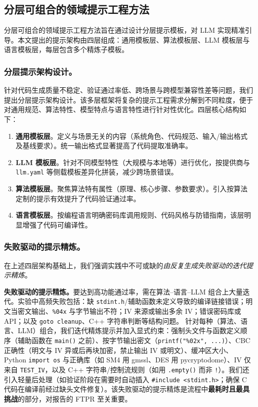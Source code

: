 \documentclass[12pt]{llncs}
\begin{document}
\subsection{分层可组合的领域提示工程方法}
分层可组合的领域提示工程方法旨在通过设计分层提示模板，对 LLM 实现精准引导。本文提出的提示架构由四层组成：通用模板层、算法模板层、LLM 模板层与语言模板层，每层包含多个精炼子模板。

\subsubsection{分层提示架构设计。}
针对代码生成质量不稳定、验证通过率低、跨场景与跨模型兼容性差等问题，我们提出分层提示架构设计。该多层框架将复杂的提示工程需求分解到不同粒度，便于对通用规范、算法特性、模型特点与语言特性进行针对性优化。四层核心结构如下：

\begin{enumerate}
    \item \textbf{通用模板层}。定义与场景无关的内容（系统角色、代码规范、输入/输出格式及基线要求）。统一输出格式显著提高了代码提取准确率。

    \item \textbf{LLM 模板层}。针对不同模型特性（大规模与本地等）进行优化，按提供商与 \texttt{llm.yaml} 等侧载模板差异化拼装，减少跨场景错误。

    \item \textbf{算法模板层}。聚焦算法特有属性（原理、核心步骤、参数要求）。引入按算法定制的提示有效提升了代码验证通过率。

    \item \textbf{语言模板层}。按编程语言明确密码库调用规则、代码风格与防错指南，该层明显增强了代码可编译性。
\end{enumerate}

\subsubsection{失败驱动的提示精炼。}
在上述四层架构基础上，我们强调实践中不可或缺的\emph{由反复生成失败驱动的迭代提示精炼}。

\textbf{失败驱动的提示精炼。}要达到高功能通过率，需在算法–语言–LLM 组合上大量迭代。实验中高频失败包括：缺 \texttt{stdint.h}/辅助函数未定义导致的编译链接错误；明文当密文输出、\texttt{\%04x} 与字节输出不符；IV 来源或输出多余 IV；错误密码库或 API；以及 \texttt{goto cleanup}、C++ 字符串判断等结构问题。
针对每种（算法、语言、LLM）组合，我们迭代精炼提示并加入显式约束：强制头文件与函数定义顺序（辅助函数在 \texttt{main()} 之前）、按字节输出密文（\texttt{printf("\%02x", ...)}）、CBC 正确性（明文与 IV 异或后再块加密，禁止输出 IV 或明文）、缓冲区大小、Python \texttt{import os} 与正确库（如 SM4 用 gmssl、DES 用 pycryptodome）、IV 仅来自 \texttt{TEST\_IV}，以及 C++ 字符串/控制流规则（如用 \texttt{.empty()} 而非 \texttt{!}）。我们还引入轻量后处理（如验证阶段在需要时自动插入 \texttt{\#include <stdint.h>}；确保 C 代码在编译前经过缺头文件修复）。该失败驱动的提示精炼是流程中\textbf{最耗时且最具挑战}的部分，对报告的 FTPR 至关重要。
\end{document}
